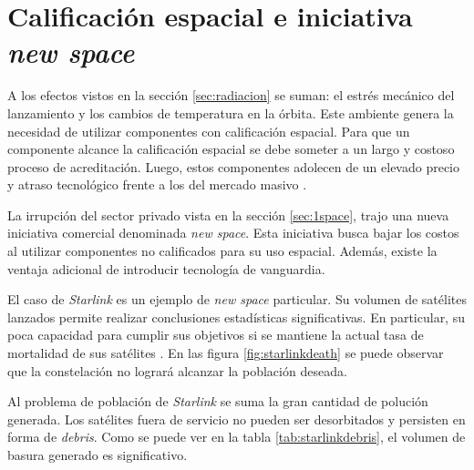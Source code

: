 \section{Calificación espacial e iniciativa \emph{new space}}
\label{sec:newspace}

A los efectos vistos en la sección \ref{sec:radiacion} se suman: el estrés mecánico del lanzamiento y los cambios de temperatura en la órbita.
Este ambiente genera la necesidad de utilizar componentes con calificación espacial.
Para que un componente alcance la calificación espacial se debe someter a un largo y costoso proceso de acreditación.
Luego, estos componentes adolecen de un elevado precio y atraso tecnológico frente a los del mercado masivo \citep{ARTICLE:negocio}.

La irrupción del sector privado vista en la sección \ref{sec:1space}, trajo una nueva iniciativa comercial denominada \emph{new space}.
Esta iniciativa busca bajar los costos al utilizar componentes no calificados para su uso espacial.
Además, existe la ventaja adicional de introducir tecnología de vanguardia.


El caso de \emph{Starlink} es un ejemplo de \emph{new space} particular.
Su volumen de satélites lanzados permite realizar conclusiones estadísticas significativas.
En particular, su poca capacidad para cumplir sus objetivos si se mantiene la actual tasa de mortalidad de sus satélites \citep{ARTICLE:cibils}.
En las figura \ref{fig:starlinkdeath} se puede observar que la constelación no logrará alcanzar la población deseada.
 
Al problema de población de \emph{Starlink} se suma la gran cantidad de polución generada.
Los satélites fuera de servicio no pueden ser desorbitados y persisten en forma de \emph{debris}.
Como se puede ver en la tabla \ref{tab:starlinkdebris}, el volumen de basura generado es significativo.

